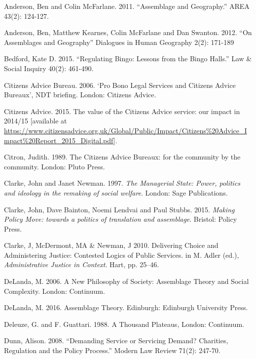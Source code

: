\label{paper5:references}
\begin{thebibliography}{99}

\item Anderson, Ben and Colin McFarlane. 2011. “Assemblage and Geography.” AREA 43(2): 124-127.
\item Anderson, Ben, Matthew Kearnes, Colin McFarlane and Dan Swanton. 2012. “On Assemblages and Geography” Dialogues in Human Geography 2(2): 171-189
\item Bedford, Kate D. 2015. “Regulating Bingo: Lessons from the Bingo Halls.” Law \& Social Inquiry 40(2): 461-490.
\item Citizens Advice Bureau. 2006. ‘Pro Bono Legal Services and Citizens Advice Bureaux’, NDT briefing. London: Citizens Advice.
\item Citizens Advice. 2015. The value of the Citizens Advice service: our impact in 2014/15 [available at \url{https://www.citizensadvice.org.uk/Global/Public/Impact/Citizens\%20Advice_Impact\%20Report_2015_Digital.pdf}].
\item Citron, Judith. 1989. The Citizens Advice Bureaux: for the community by the community. London: Pluto Press.
\item Clarke, John and Janet Newman. 1997. \textit{The Managerial State: Power, politics and ideology in the remaking of social welfare}. London: Sage Publications.
\item Clarke, John, Dave Bainton, Noemi Lendvai and Paul Stubbs. 2015. \textit{Making Policy Move: towards a politics of translation and assemblage}. Bristol: Policy Press.
\item Clarke, J, McDermont, MA \& Newman, J 2010. Delivering Choice and Administering Justice: Contested Logics of Public Services. in M. Adler (ed.), \textit{Administrative Justice in Context}. Hart, pp. 25--46.
\item DeLanda, M. 2006. A New Philosophy of Society: Assemblage Theory and Social Complexity. London: Continuum.
\item DeLanda, M. 2016. Assemblage Theory. Edinburgh: Edinburgh University Press.
\item Deleuze, G. and F. Guattari. 1988. A Thousand Plateaus, London: Continuum.
\item Dunn, Alison. 2008. “Demanding Service or Servicing Demand? Charities, Regulation and the Policy Process.” Modern Law Review 71(2): 247-70.

\end{thebibliography}
